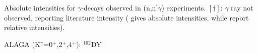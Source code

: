 \begin{flushleft}
\begin{singlespace}
Absolute intensities for $\gamma$-decays observed in (n,n$^\prime\gamma$) experiments. $[\dagger]$: $\gamma$ ray not observed, reporting literature intensity (\cite{Aprahamian200642,Govor_162Dy2002} gives absolute intensities, while \cite{Zamfir_162Dy0_1999,Wu_2minus_2001} report relative intensities).
\end{singlespace}
\end{flushleft}

 \begin{table}
 \begin{center}
 \caption{ALAGA (K$^\pi$=0$^+$,2$^+$,4$^+$): $^{162}$DY \label{tab:162Dy_posparity_ALAGA}}


\end{center}
\end{table}

